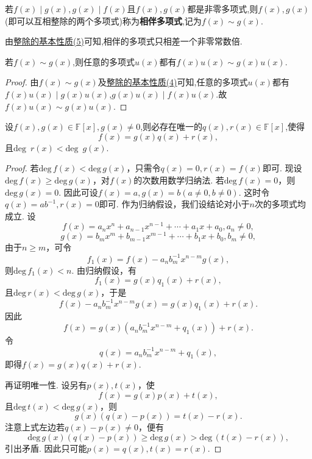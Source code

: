 \documentclass[lang=cn,newtx,10pt,scheme=chinese]{elegantbook}
\begin{document}
\begin{definition}[相伴多项式]\label{definition:}
若\(f(x)\mid g(x),g(x)\mid f(x)\)且\(f(x),g(x)\)都是非零多项式,则$f(x),g(x)$(即可以互相整除的两个多项式)称为\textbf{相伴多项式},记为\(f(x)\sim g(x)\).
\end{definition}
\begin{note}
由\hyperref[proposition:整除的基本性质]{整除的基本性质(5)}可知,相伴的多项式只相差一个非零常数倍.
\end{note}

\begin{proposition}[相伴多项式的基本性质]\label{proposition:相伴多项式的基本性质}
若$f(x)\sim g(x)$,则任意的多项式$u(x)$都有$f(x)u(x)\sim g(x)u(x)$.
\end{proposition}
\begin{proof}
由$f(x)\sim g(x)$及\hyperref[proposition:整除的基本性质]{整除的基本性质(4)}可知,任意的多项式$u(x)$都有$f(x)u(x)\mid g(x)u(x)$,$g(x)u(x)\mid f(x)u(x)$.故$f(x)u(x)\sim g(x)u(x)$.
\end{proof}

\begin{theorem}[多项式的带余除法]\label{theorem:多项式的带余除法}
设\(f(x),g(x)\in\mathbb{F}[x],g(x)\neq 0\),则必存在唯一的\(q(x),r(x)\in\mathbb{F}[x]\),使得
\[
f(x)=g(x)q(x)+r(x),
\]
且\(\text{deg }\,r(x)<\text{deg }\,g(x)\).
\end{theorem}
\begin{proof}
若\(\mathrm{deg }\,f(x)<\mathrm{deg }\,g(x)\)，只需令\(q(x)=0,r(x)=f(x)\)即可.
现设\(\mathrm{deg }\,f(x)\geq\mathrm{deg }\,g(x)\)，对\(f(x)\)的次数用数学归纳法. 若\(\mathrm{deg }\,f(x)=0\)，则\(\mathrm{deg }\,g(x)=0\). 因此可设\(f(x)=a,g(x)=b(a\neq 0,b\neq 0)\). 这时令\(q(x)=ab^{-1},r(x)=0\)即可. 作为归纳假设，我们设结论对小于\(n\)次的多项式均成立. 设
\[
f(x)=a_nx^n + a_{n - 1}x^{n - 1}+\cdots+a_1x + a_0, a_n\neq 0,
\]
\[
g(x)=b_mx^m + b_{m - 1}x^{m - 1}+\cdots+b_1x + b_0, b_m\neq 0,
\]
由于\(n\geq m\)，可令
\[
f_1(x)=f(x)-a_nb_m^{-1}x^{n - m}g(x),
\]
则\(\mathrm{deg }\,f_1(x)<n\). 由归纳假设，有
\[
f_1(x)=g(x)q_1(x)+r(x),
\]
且\(\mathrm{deg }\,r(x)<\mathrm{deg }\,g(x)\)，于是
\[
f(x)-a_nb_m^{-1}x^{n - m}g(x)=g(x)q_1(x)+r(x).
\]
因此
\[
f(x)=g(x)(a_nb_m^{-1}x^{n - m}+q_1(x))+r(x).
\]
令
\[
q(x)=a_nb_m^{-1}x^{n - m}+q_1(x),
\]
即得$f(x)=g(x)q(x)+r(x)$.

再证明唯一性. 设另有\(p(x),t(x)\)，使
\[
f(x)=g(x)p(x)+t(x),
\]
且\(\mathrm{deg }\,t(x)<\mathrm{deg }\,g(x)\)，则
\[
g(x)(q(x)-p(x))=t(x)-r(x).
\]
注意上式左边若\(q(x)-p(x)\neq 0\)，便有
\[
\mathrm{deg }\,g(x)(q(x)-p(x))\geq\mathrm{deg }\,g(x)>\mathrm{deg }\,(t(x)-r(x)),
\]
引出矛盾. 因此只可能\(p(x)=q(x),t(x)=r(x)\).
\end{proof}
\end{document}

